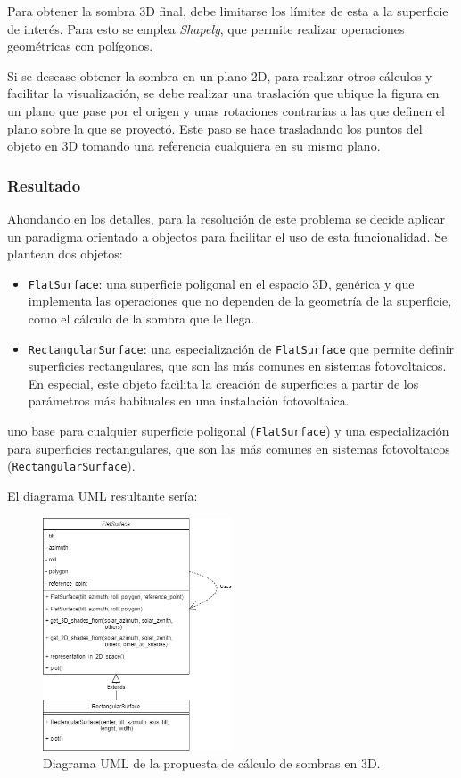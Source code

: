 Para obtener la sombra 3D final, debe limitarse los límites de esta a la superficie de interés. Para esto se emplea \textit{Shapely}, que permite realizar operaciones geométricas con polígonos.

Si se desease obtener la sombra en un plano 2D, para realizar otros cálculos y facilitar la visualización, se debe realizar una traslación que ubique la figura en un plano que pase por el origen y unas rotaciones contrarias a las que definen el plano sobre la que se proyectó. Este paso se hace trasladando los puntos del objeto en 3D tomando una referencia cualquiera en su mismo plano.

\subsubsection{Resultado}

Ahondando en los detalles, para la resolución de este problema se decide aplicar un paradigma orientado a objectos para facilitar el uso de esta funcionalidad. Se plantean dos objetos:

\begin{itemize}
    \item \texttt{FlatSurface}: una superficie poligonal en el espacio 3D, genérica y que implementa las operaciones que no dependen de la geometría de la superficie, como el cálculo de la sombra que le llega.
    \item \texttt{RectangularSurface}: una especialización de \texttt{FlatSurface} que permite definir superficies rectangulares, que son las más comunes en sistemas fotovoltaicos. En especial, este objeto facilita la creación de superficies a partir de los parámetros más habituales en una instalación fotovoltaica.
\end{itemize}

uno base para cualquier superficie poligonal (\texttt{FlatSurface}) y una especialización para superficies rectangulares, que son las más comunes en sistemas fotovoltaicos (\texttt{RectangularSurface}).

El diagrama UML resultante sería:

\begin{figure}[H]
    \centering
    \includegraphics[width=0.5\textwidth]{./images/shading_3d/shading_classes.png}
    \caption{Diagrama UML de la propuesta de cálculo de sombras en 3D.}
    \label{fig:uml_sombreado}
\end{figure}

